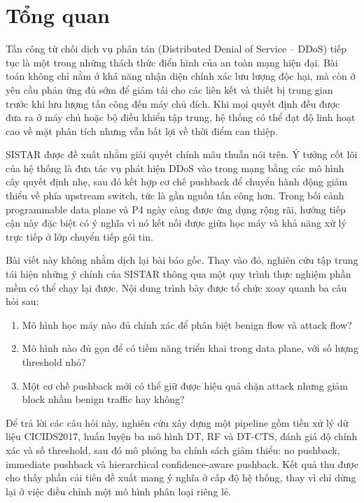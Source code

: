 \section{Tổng quan}

Tấn công từ chối dịch vụ phân tán (Distributed Denial of Service -- DDoS) tiếp tục là một trong những thách thức điển hình của an toàn mạng hiện đại. Bài toán không chỉ nằm ở khả năng nhận diện chính xác lưu lượng độc hại, mà còn ở yêu cầu phản ứng đủ sớm để giảm tải cho các liên kết và thiết bị trung gian trước khi lưu lượng tấn công đến máy chủ đích. Khi mọi quyết định đều được đưa ra ở máy chủ hoặc bộ điều khiển tập trung, hệ thống có thể đạt độ linh hoạt cao về mặt phân tích nhưng vẫn bất lợi về thời điểm can thiệp.

SISTAR được đề xuất nhằm giải quyết chính mâu thuẫn nói trên. Ý tưởng cốt lõi của hệ thống là đưa tác vụ phát hiện DDoS vào trong mạng bằng các mô hình cây quyết định nhẹ, sau đó kết hợp cơ chế pushback để chuyển hành động giảm thiểu về phía upstream switch, tức là gần nguồn tấn công hơn. Trong bối cảnh programmable data plane và P4 ngày càng được ứng dụng rộng rãi, hướng tiếp cận này đặc biệt có ý nghĩa vì nó kết nối được giữa học máy và khả năng xử lý trực tiếp ở lớp chuyển tiếp gói tin.

Bài viết này không nhằm dịch lại bài báo gốc. Thay vào đó, nghiên cứu tập trung tái hiện những ý chính của SISTAR thông qua một quy trình thực nghiệm phần mềm có thể chạy lại được. Nội dung trình bày được tổ chức xoay quanh ba câu hỏi sau:
\begin{enumerate}
\item Mô hình học máy nào đủ chính xác để phân biệt benign flow và attack flow?
\item Mô hình nào đủ gọn để có tiềm năng triển khai trong data plane, với số lượng threshold nhỏ?
\item Một cơ chế pushback mới có thể giữ được hiệu quả chặn attack nhưng giảm block nhầm benign traffic hay không?
\end{enumerate}

Để trả lời các câu hỏi này, nghiên cứu xây dựng một pipeline gồm tiền xử lý dữ liệu CICIDS2017, huấn luyện ba mô hình DT, RF và DT-CTS, đánh giá độ chính xác và số threshold, sau đó mô phỏng ba chính sách giảm thiểu: no pushback, immediate pushback và hierarchical confidence-aware pushback. Kết quả thu được cho thấy phần cải tiến đề xuất mang ý nghĩa ở cấp độ hệ thống, thay vì chỉ dừng lại ở việc điều chỉnh một mô hình phân loại riêng lẻ.
